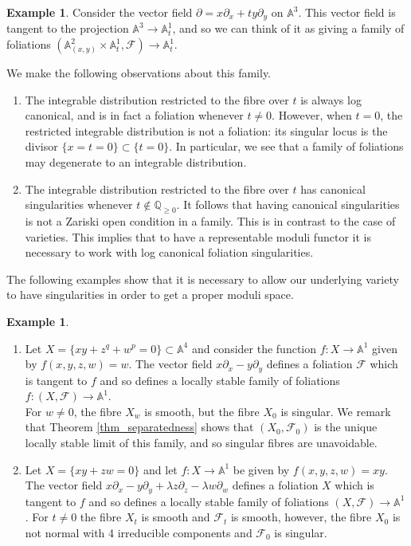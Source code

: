\documentclass[12pt, a4paper]{amsart}
\newcounter{Theorem}
\theoremstyle{definition}
\newtheorem{ej}[theorem]{Example}
\theoremstyle{named}
\begin{document}
\begin{ej}
\label{easiest_example}
    Consider the vector field $\partial = x\partial_x+ty\partial_y$ on $\mathbb A^3$.
    This vector field is tangent to the projection $\mathbb A^3 \to \mathbb A^1_t$, and so we can think of it as giving
    a family of foliations $(\mathbb A_{(x, y)}^2 \times \mathbb A_t^1, \mathcal F) \to \mathbb A_t^1$.

We make the following observations about this family.

\begin{enumerate}
    \item 
    The integrable distribution restricted to the fibre over $t$ is always log canonical, and is in fact a foliation whenever $t \neq 0$.  However, when $t=0$, the restricted integrable distribution is not a foliation: its singular locus is the divisor $\{x = t = 0\} \subset \{t = 0\}$.  In particular, we see that a family of foliations may degenerate to an integrable distribution.

    \item The integrable distribution restricted to the fibre over $t$ has canonical singularities whenever $t \notin \mathbb Q_{\ge 0}$. It follows that having canonical singularities is not a Zariski open condition in a family.  This is in contrast to the case of varieties.  This implies that to have a representable moduli functor it is necessary to work with log canonical foliation singularities.
    \end{enumerate}
\end{ej}


The following examples show that it is necessary to allow our underlying variety to have singularities in order to get a proper moduli space.

\begin{ej}
\begin{enumerate}
    \item Let $X = \{xy+z^q+w^p = 0\}\subset \mathbb A^4$ and consider the function $f\colon X \to \mathbb A^1$ given by $f(x, y, z, w) = w$.
The vector field $x\partial_x-y\partial_y$
defines a foliation $\mathcal F$ which is tangent to $f$ and so defines a locally stable family of foliations $f\colon (X, \mathcal F) \to \mathbb A^1$.  
\\
For $w \neq 0$, the fibre $X_w$ is smooth, but the fibre $X_0$ is singular.  We remark that Theorem \ref{thm_separatedness} shows that $(X_0, \mathcal F_0)$ is the unique locally stable limit of this family, and so singular fibres are unavoidable.

\item Let $X = \{xy+zw = 0\}$ and let $f\colon X \to \mathbb A^1$ be given by
$f(x, y, z, w) = xy$. The vector field $x\partial_x-y\partial_y+\lambda z\partial_z-\lambda w\partial_w$ defines a foliation $X$ which is tangent to $f$ and so defines a locally stable family of foliations $(X, \mathcal F) \to \mathbb A^1$. For $t \neq 0$ the fibre $X_t$ is smooth and $\mathcal F_t$ is smooth, however, the fibre $X_0$ is not normal with 4 irreducible components and $\mathcal F_0$ is singular.

    \end{enumerate}
\end{ej}
\end{document}
